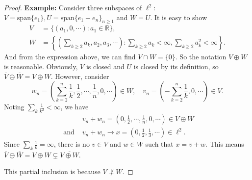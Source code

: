 \documentclass[12pt]{article}
\renewcommand{\(}{\left(}%
\renewcommand{\)}{\right)}%
\renewcommand{\[}{\left[}%
\renewcommand{\]}{\right]}%
\renewcommand{\r}{\mathbb{R}}
\newtheorem{proof}{Proof.}}
\begin{document}
\begin{proof}
  	{\bfseries Example:} Consider three subspaces of $\ell^2$: $V=\mathrm{span}\{e_1\},U=\mathrm{span}\{e_1+e_n\}_{n\geq 1}$ and $W=\overline{U}$. It is easy to show
  	\begin{equation*}
  		\begin{split}
  			V&=\{(a_1,0,\cdots):a_1\in\r\},\\
  			W&=\left\{\(\sum_{k\geq 2}a_k,a_2,a_3,\cdots\):\sum_{k\geq 2}a_k<\infty,\sum_{k\geq 2}a_k^2<\infty\right\}.
  		\end{split}
  	\end{equation*}
  	And from the expression above, we can find $V\cap W=\{0\}$. So the notation $V\oplus W$ is reasonable. Obviously, $V$ is closed and $U$ is closed by its definition, so $\overline{V}\oplus \overline{W}=V\oplus W$. However, consider
  	\begin{equation*}
  		w_n=\(\sum_{k= 2}^n \frac{1}{k} ,\frac{1}{2} ,\cdots,\frac{1}{n},0,\cdots \)\in W,\quad v_n=\(-\sum_{k= 2}^n \frac{1}{k},0,\cdots\)\in V.
  	\end{equation*}
  	Noting $\sum_k \frac{1}{k^2}<\infty$, we have 
  	\begin{equation*}
  		\begin{split}
  			&v_n+w_n=\(0,\frac{1}{2} ,\cdots,\frac{1}{n},0,\cdots\)\in V\oplus W\\
  			\text{ and }&v_n+w_n\to x=\(0,\frac{1}{2},\frac{1}{3},\cdots\)\in \ell^2.
  		\end{split}
  	\end{equation*}
  	Since $\sum_k \frac{1}{k}=\infty$, there is no $v\in V$ and $w\in W$ such that $x=v+w$. This means $\overline{V}\oplus \overline{W}=V\oplus W\subsetneq\overline{V\oplus W}$.
  	
  	This partial inclusion is because $V\not\perp W$. 
  \end{proof}
  
\end{document}
